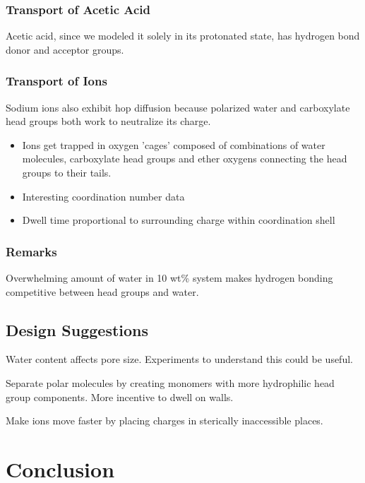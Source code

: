 \documentclass{article}
\begin{document}
  \subsubsection*{Transport of Acetic Acid}

  Acetic acid, since we modeled it solely in its protonated state, has hydrogen
  bond donor and acceptor groups. 

  \subsubsection*{Transport of Ions} %

  Sodium ions also exhibit hop diffusion because polarized water and
  carboxylate head groups both work to neutralize its charge.
  \begin{itemize}
	\item Ions get trapped in oxygen 'cages' composed of combinations
	of water molecules, carboxylate head groups and ether oxygens connecting
	the head groups to their tails.
  	\item Interesting coordination number data
	\item Dwell time proportional to surrounding charge within coordination shell
  \end{itemize}

  \subsubsection*{Remarks}
   
  Overwhelming amount of water in 10 wt\% system makes hydrogen bonding
  competitive between head groups and water.

  \subsection{Design Suggestions}

  Water content affects pore size. Experiments to understand this could be useful.

  Separate polar molecules by creating monomers with more hydrophilic head group components.
  More incentive to dwell on walls.

  Make ions move faster by placing charges in sterically inaccessible places. 

  \section{Conclusion}
\end{document}
